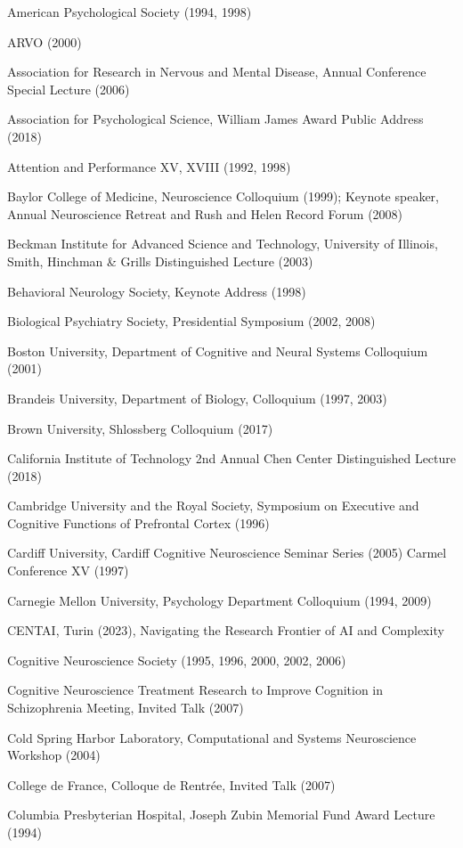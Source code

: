 \documentclass[10 pt]{article}
\begin{document}
American Psychological Society (1994, 1998)

ARVO (2000)

Association for Research in Nervous and Mental Disease, Annual Conference Special Lecture (2006)

Association for Psychological Science, William James Award Public Address (2018)

Attention and Performance XV, XVIII (1992, 1998)

Baylor College of Medicine, Neuroscience Colloquium (1999); Keynote speaker, Annual Neuroscience Retreat and Rush and Helen Record Forum (2008)

Beckman Institute for Advanced Science and Technology, University of Illinois, Smith, Hinchman \& Grills Distinguished Lecture (2003)

Behavioral Neurology Society, Keynote Address (1998)

Biological Psychiatry Society, Presidential Symposium (2002, 2008)

Boston University, Department of Cognitive and Neural Systems Colloquium (2001)

Brandeis University, Department of Biology, Colloquium (1997, 2003)

Brown University, Shlossberg Colloquium (2017)

California Institute of Technology 2nd Annual Chen Center Distinguished Lecture (2018)

Cambridge University and the Royal Society, Symposium on Executive and Cognitive Functions of Prefrontal Cortex (1996)

Cardiff University, Cardiff Cognitive Neuroscience Seminar Series (2005)
Carmel Conference XV (1997)

Carnegie Mellon University, Psychology Department Colloquium (1994, 2009)

CENTAI, Turin (2023), Navigating the Research Frontier of AI and Complexity

Cognitive Neuroscience Society (1995, 1996, 2000, 2002, 2006)

Cognitive Neuroscience Treatment Research to Improve Cognition in Schizophrenia Meeting, Invited Talk (2007)

Cold Spring Harbor Laboratory, Computational and Systems Neuroscience Workshop (2004)

College de France, Colloque de Rentrée, Invited Talk (2007)

Columbia Presbyterian Hospital, Joseph Zubin Memorial Fund Award Lecture (1994)
\end{document}
